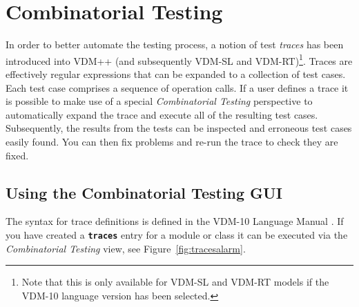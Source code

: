 \documentclass{overturerepchap}
\begin{document}



\chapter{Combinatorial Testing}\label{sec:testing}

In order to better automate the testing process, a notion of
test \emph{traces} has been introduced into VDM++ (and subsequently VDM-SL and VDM-RT)\footnote{Note that this is
only available for VDM-SL and VDM-RT models if the VDM-10 language version has been selected.}.
Traces are effectively regular expressions that can be expanded to a collection of test
cases. Each test case comprises a sequence of operation
calls. If a user defines a trace it is possible to make use of a
special \emph{Combinatorial Testing} perspective to automatically
expand the trace and execute all of the resulting test
cases. Subsequently, the results from the tests can be inspected
and erroneous test cases easily found. You can then fix
problems and re-run the trace to check they are fixed.

\section{Using the Combinatorial Testing GUI}

The syntax for trace definitions is defined in the VDM-10 Language
Manual \cite{Larsen&10b}.
If you have created a {\textbf\texttt{traces}} entry for a module or class it
can be executed via the \emph{Combinatorial Testing}
view, see
Figure~\ref{fig:tracesalarm}.
\end{document}
